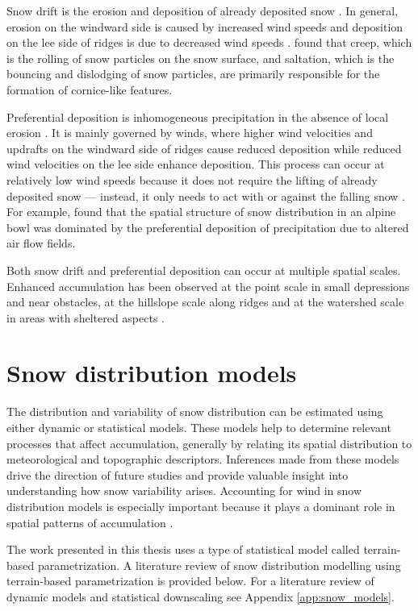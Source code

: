 \documentclass{sfuthesis}
\begin{document}
Snow drift is the erosion and deposition of already deposited snow \citep{Dadic2010}. In general, erosion on the windward side is caused by increased wind speeds and deposition on the lee side of ridges is due to decreased wind speeds \citep{Liston1998, Mott2008, Dadic2010}. \cite{Mott2010} found that creep, which is the rolling of snow particles on the snow surface, and saltation, which is the bouncing and dislodging of snow particles, are primarily responsible for the formation of cornice-like features. 

Preferential deposition is inhomogeneous precipitation in the absence of local erosion \citep{Lehning2008}. It is mainly governed by winds, where higher wind velocities and updrafts on the windward side of ridges cause reduced deposition while reduced wind velocities on the lee side enhance deposition. This process can occur at relatively low wind speeds because it does not require the lifting of already deposited snow  --- instead, it only needs to act with or against the falling snow \citep{Mott2008, Dadic2010}. For example, \cite{Mott2011} found that the spatial structure of snow distribution in an alpine bowl was dominated by the preferential deposition of precipitation due to altered air flow fields. 

Both snow drift and preferential deposition can occur at multiple spatial scales. Enhanced accumulation has been observed at the point scale in small depressions and near obstacles, at the hillslope scale along ridges and at the watershed scale in areas with sheltered aspects \citep{Harrison1986, Bloeschl1992, Mott2008, Winstral2002, Clark2011}. 

\section{Snow distribution models}
The distribution and variability of snow distribution can be estimated using either dynamic or statistical models. These models help to determine relevant processes that affect accumulation, generally by relating its spatial distribution to meteorological and topographic descriptors. Inferences made from these models drive the direction of future studies and provide valuable insight into understanding how snow variability arises. Accounting for wind in snow distribution models is especially important because it plays a dominant role in spatial patterns of accumulation \citep{Winstral2013}. 

The work presented in this thesis uses a type of statistical model called terrain-based parametrization. A literature review of snow distribution modelling using terrain-based parametrization is provided below. For a literature review of dynamic models and statistical downscaling see Appendix \ref{app:snow_models}. 
\end{document}
